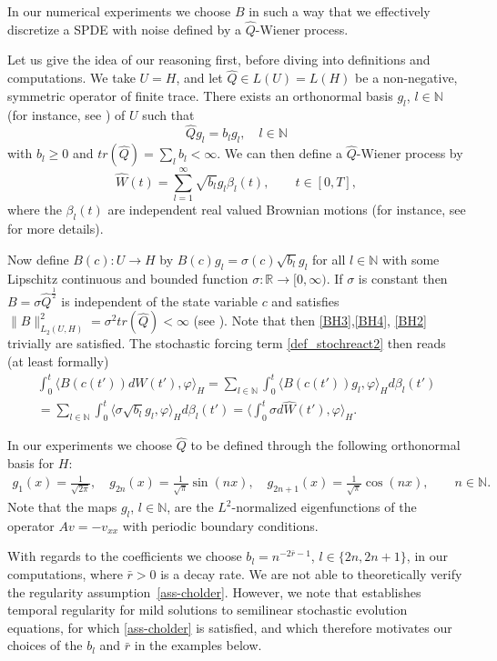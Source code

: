 \documentclass[a4paper,10pt]{article}
\newcommand{\R}{\mathbb{R}}
\newcommand{\N}{\mathbb{N}}
\numberwithin{equation}{section}
\begin{document}
In our numerical experiments we choose $B$ in such a way that we effectively discretize a SPDE with noise defined by a $\hat{Q}$-Wiener process. 

Let us give the idea of our reasoning first, before diving into definitions and computations. We take $U=H$, and let $\hat{Q} \in L(U)=L(H)$ be a non-negative, symmetric operator of finite trace. There exists an orthonormal basis $g_{l}$, $l \in \N$ (for instance, see \cite[Proposition~2.1.5]{RoecknerBuch}) of $U$ such that
$$ \hat{Q}g_{l} = b_{l} g_{l}, \quad l \in \N $$
with $b_{l} \geq 0$ and $tr(\hat{Q}) = \sum_{l} b_{l} < \infty$. We can then define a $\hat{Q}$-Wiener process by
$$ \hat{W}(t) = \sum_{l=1}^{\infty} \sqrt{b_{l}} g_{l} \beta_{l}(t), \qquad t \in [0,T], $$
where the $\beta_{l}(t)$ are independent real valued Brownian motions (for instance, see \cite[Proposition 2.1.10]{RoecknerBuch} for more details).

Now define $B(c): U \to H$ by $B(c) g_{l} = \sigma(c) \sqrt{b_{l}} g_{l}$ for all $l \in \N$
with some Lipschitz continuous and bounded function $\sigma : \R \to [0,\infty)$.
If $\sigma$ is constant then $B = \sigma \hat{Q}^{\frac{1}{2}}$ is independent of the state variable $c$ and satisfies $\|B\|^{2}_{L_{2}(U,H)} = \sigma^2 tr(\hat{Q}) < \infty$ (see \cite[Proposition~2.3.4]{RoecknerBuch}). Note that then \eqref{BH3},\eqref{BH4}, \eqref{BH2} trivially are satisfied.
The stochastic forcing term \eqref{def_stochreact2} then reads (at least formally)
\begin{multline*}
\int_{0}^{t} \langle B(c(t')) dW(t'), \varphi \rangle_{H} = \sum_{l \in \N} \int_{0}^{t} \langle B(c(t')) g_{l}, \varphi \rangle_{H} d \beta_{l}(t') \\
=\sum_{l \in \N} \int_{0}^{t} \langle \sigma \sqrt{b_{l}} g_{l}, \varphi \rangle_{H} d \beta_{l}(t') = \langle \int_{0}^{t} \sigma d\hat{W}(t'), \varphi \rangle_{H}.
\end{multline*}

In our experiments we choose $\hat{Q}$ to be defined through the following orthonormal basis for $H$:
\begin{align}\label{gBasis}
 g_1(x) = \frac{1}{\sqrt{2\pi}}, \quad g_{2n}(x) = \frac{1}{\sqrt{\pi}} \sin(nx), \quad g_{2n+1}(x) = \frac{1}{\sqrt{\pi}} \cos(nx), \qquad n \in \N.
\end{align}
Note that the maps $g_{l}$, $l \in \N$, are the $L^2$-normalized eigenfunctions of the operator $Av = - v_{xx}$ with periodic boundary conditions.

With regards to the coefficients we choose $b_{l} = n^{-2\bar{r}-1}$, $l \in \{ 2n, 2n+1 \}$, in our computations, where $\bar{r}>0$ is a decay rate. We are not able to theoretically verify the regularity assumption~\eqref{ass-cholder}. However, we note that \cite[Theorem 2.31]{Kruse14} establishes temporal regularity for mild solutions to semilinear stochastic evolution equations, for which \eqref{ass-cholder} is satisfied, and which therefore motivates our choices of the $b_l$ and $\bar{r}$ in the examples below.
\end{document}
